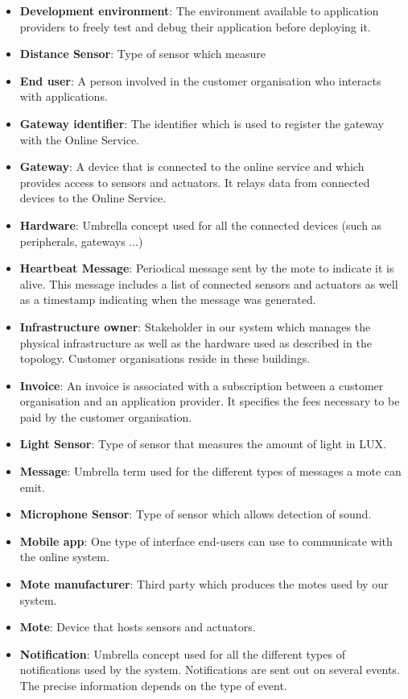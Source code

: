 \begin{itemize}
	\item \textbf{Development environment}: The environment available to application providers to freely test and debug their application before deploying it.
	\item \textbf{Distance Sensor}: Type of sensor which measure 
	\item \textbf{End user}: A person involved in the customer organisation who interacts with applications.
	\item \textbf{Gateway identifier}: The identifier which is used to register the gateway with the Online Service.
	\item \textbf{Gateway}: A device that is connected to the online service and which provides access to sensors and actuators. It relays data from connected devices to the Online Service.
	\item \textbf{Hardware}: Umbrella concept used for all the connected devices (such as peripherals, gateways ...)
	\item \textbf{Heartbeat Message}: Periodical message sent by the mote to indicate it is alive. This message includes a list of connected sensors and actuators as well as a timestamp indicating when the message was generated.
	\item \textbf{Infrastructure owner}: Stakeholder in our system which manages the physical infrastructure as well as the hardware used as described in the topology. Customer organisations reside in these buildings.
	\item \textbf{Invoice}: An invoice is associated with a subscription between a customer organisation and an application provider. It specifies the fees necessary to be paid by the customer organisation.
	\item \textbf{Light Sensor}: Type of sensor that measures the amount of light in LUX.
	\item \textbf{Message}: Umbrella term used for the different types of messages a mote can emit.
	\item \textbf{Microphone Sensor}: Type of sensor which allows detection of sound. 
	\item \textbf{Mobile app}: One type of interface end-users can use to communicate with the online system.
	\item \textbf{Mote manufacturer}: Third party which produces the motes used by our system.
	\item \textbf{Mote}: Device that hosts sensors and actuators.
	\item \textbf{Notification}: Umbrella concept used for all the different types of notifications used by the system. Notifications are sent out on several events. The precise information depends on the type of event.

\end{itemize}
